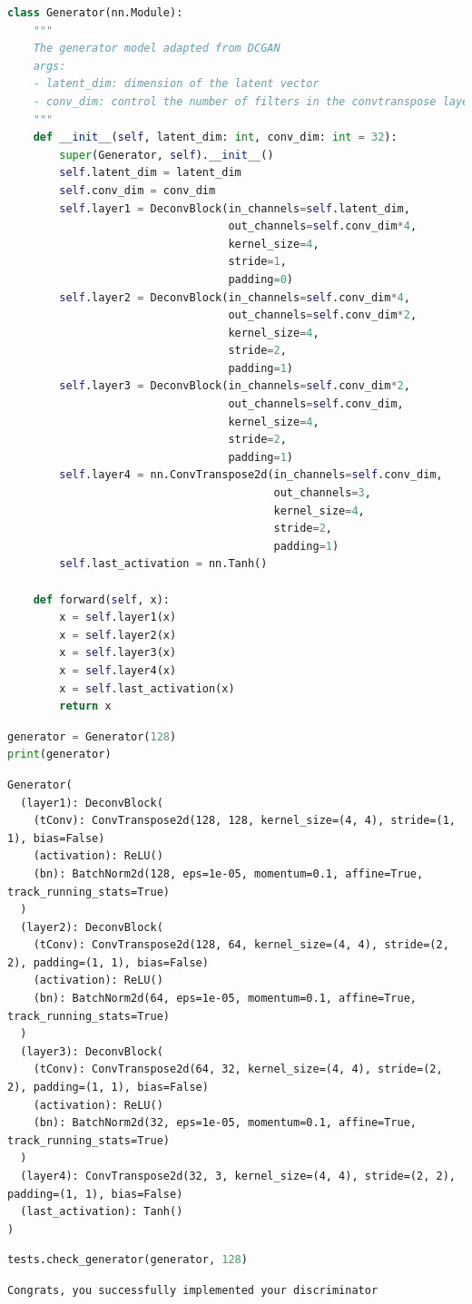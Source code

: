 \begin{lstlisting}[language=Python]
class Generator(nn.Module):
    """
    The generator model adapted from DCGAN
    args:
    - latent_dim: dimension of the latent vector
    - conv_dim: control the number of filters in the convtranspose layers
    """
    def __init__(self, latent_dim: int, conv_dim: int = 32):
        super(Generator, self).__init__()
        self.latent_dim = latent_dim
        self.conv_dim = conv_dim
        self.layer1 = DeconvBlock(in_channels=self.latent_dim, 
                                  out_channels=self.conv_dim*4, 
                                  kernel_size=4, 
                                  stride=1, 
                                  padding=0)
        self.layer2 = DeconvBlock(in_channels=self.conv_dim*4, 
                                  out_channels=self.conv_dim*2, 
                                  kernel_size=4, 
                                  stride=2, 
                                  padding=1)
        self.layer3 = DeconvBlock(in_channels=self.conv_dim*2, 
                                  out_channels=self.conv_dim, 
                                  kernel_size=4, 
                                  stride=2, 
                                  padding=1)
        self.layer4 = nn.ConvTranspose2d(in_channels=self.conv_dim,
                                         out_channels=3, 
                                         kernel_size=4, 
                                         stride=2, 
                                         padding=1)
        self.last_activation = nn.Tanh()
        
    def forward(self, x):
        x = self.layer1(x)
        x = self.layer2(x)
        x = self.layer3(x)
        x = self.layer4(x)
        x = self.last_activation(x)
        return x
\end{lstlisting}

\begin{lstlisting}[language=Python]
generator = Generator(128)
print(generator)
\end{lstlisting}

\begin{lstlisting}
Generator(
  (layer1): DeconvBlock(
    (tConv): ConvTranspose2d(128, 128, kernel_size=(4, 4), stride=(1, 1), bias=False)
    (activation): ReLU()
    (bn): BatchNorm2d(128, eps=1e-05, momentum=0.1, affine=True, track_running_stats=True)
  )
  (layer2): DeconvBlock(
    (tConv): ConvTranspose2d(128, 64, kernel_size=(4, 4), stride=(2, 2), padding=(1, 1), bias=False)
    (activation): ReLU()
    (bn): BatchNorm2d(64, eps=1e-05, momentum=0.1, affine=True, track_running_stats=True)
  )
  (layer3): DeconvBlock(
    (tConv): ConvTranspose2d(64, 32, kernel_size=(4, 4), stride=(2, 2), padding=(1, 1), bias=False)
    (activation): ReLU()
    (bn): BatchNorm2d(32, eps=1e-05, momentum=0.1, affine=True, track_running_stats=True)
  )
  (layer4): ConvTranspose2d(32, 3, kernel_size=(4, 4), stride=(2, 2), padding=(1, 1), bias=False)
  (last_activation): Tanh()
)
\end{lstlisting}

\begin{lstlisting}[language=Python]
tests.check_generator(generator, 128)
\end{lstlisting}

\begin{lstlisting}
Congrats, you successfully implemented your discriminator
\end{lstlisting}
